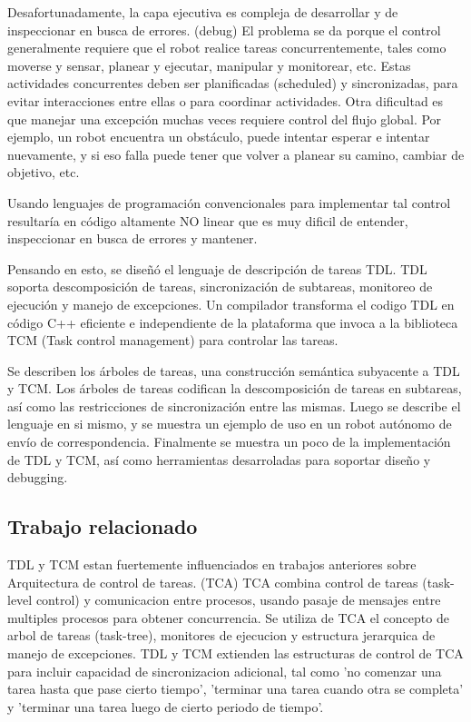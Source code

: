Desafortunadamente, la capa ejecutiva es compleja de desarrollar y de
inspeccionar en busca de errores. (debug)
El problema se da porque el control generalmente requiere que el robot
realice tareas concurrentemente, tales como moverse y sensar,
planear y ejecutar, manipular y monitorear, etc.
Estas actividades concurrentes deben ser planificadas (scheduled) y
sincronizadas, para evitar interacciones entre ellas o para
coordinar actividades.
Otra dificultad es que manejar una excepción muchas veces requiere control
del flujo global.
Por ejemplo, un robot encuentra un obstáculo, puede intentar esperar e
intentar nuevamente, y si eso falla puede tener que volver a 
planear su camino, cambiar de objetivo, etc.

Usando lenguajes de programación convencionales para implementar tal control
resultaría en código altamente NO linear que es muy 
dificil de entender, inspeccionar en busca de errores y mantener.

Pensando en esto, se diseñó el lenguaje de descripción de tareas TDL.
TDL soporta descomposición de tareas, sincronización de subtareas, monitoreo
de ejecución y manejo de excepciones.
Un compilador transforma el codigo TDL en código C++ eficiente e independiente
de la plataforma que invoca a la biblioteca TCM (Task control management)
para controlar las tareas.

Se describen los árboles de tareas, una construcción semántica subyacente a
TDL y TCM. 
Los árboles de tareas codifican la descomposición de tareas en subtareas, así
como las restricciones de sincronización entre las mismas.
Luego se describe el lenguaje en si mismo, y se muestra un ejemplo de uso en
un robot autónomo de envío de correspondencia.
Finalmente se muestra un poco de la implementación de TDL y TCM, así como
herramientas desarroladas para soportar diseño y debugging.


\subsection{Trabajo relacionado}

TDL y TCM estan fuertemente influenciados en trabajos anteriores sobre
 Arquitectura de control de tareas. (TCA)
TCA combina control de tareas (task-level control) y comunicacion entre
 procesos, usando pasaje de mensajes entre multiples procesos
para obtener concurrencia. 
Se utiliza de TCA el concepto de arbol de tareas (task-tree), monitores de 
ejecucion y estructura jerarquica de manejo de excepciones.
TDL y TCM extienden las estructuras de control de TCA para incluir 
capacidad de sincronizacion adicional, tal como 'no comenzar una tarea hasta 
que pase cierto tiempo', 'terminar una tarea cuando otra se completa' y 
'terminar una tarea luego de cierto periodo de tiempo'.

